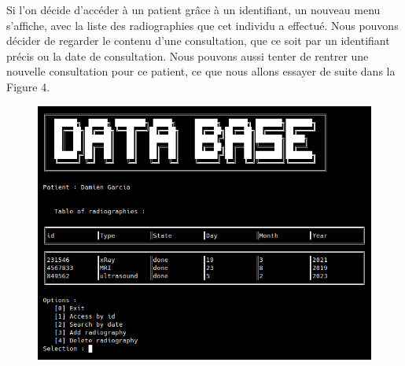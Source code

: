 \documentclass[12pt,a4paper]{article}
\begin{document}
\begin{multicols}{2}
Si l'on décide d'accéder à un patient grâce à un identifiant, un nouveau menu s'affiche, avec la liste des radiographies que cet individu a effectué. Nous pouvons décider de regarder le contenu d'une consultation, que ce soit par un identifiant précis ou la date de consultation. Nous pouvons aussi tenter de rentrer une nouvelle consultation pour ce patient, ce que nous allons essayer de suite dans la Figure 4.
		
\begin{figure}
	\centering
	\includegraphics[width=\linewidth]{images/walkthrough/doctor_patient_main.png}
	\label{fig:menu_patient}
\end{figure}
		

\end{multicols}
	
\end{document}
